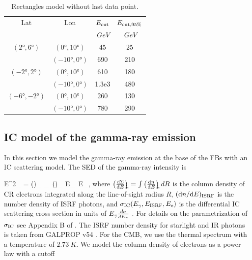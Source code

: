 \begin{table}
  \begin{center}
    \caption{Rectangles model without last data point.}
        \begin{tabular}{|c|c|c|c|} %
     	\hline
		 Lat & Lon  &  $E_{\rm cut}$ &   $E_{\rm cut, 95\%}$  \\ 
		       &        &  {\small $\SI{}{GeV}$ }& {\small  $\SI{}{GeV}$ }\\ 
		\hline
  		$(\ang{2}, \ang{6})$ & $(\ang{0}, \ang{10})$ & 45 &25 \\ 
		& $(\ang{-10}, \ang{0})$ & 690 & 210 \\ 
 		\hline
  		$(\ang{-2}, \ang{2})$ & $(\ang{0}, \ang{10})$  & 610 & 180  \\ 
		& $(\ang{-10}, \ang{0})$    & 1.3e3 & 480\\ 
 		\hline
  		$(\ang{-6}, \ang{-2})$ & $(\ang{0}, \ang{10})$ & 260 & 130   \\ 
		& $(\ang{-10}, \ang{0})$  & 780 & 290\\ 
 \hline
    \end{tabular}
  \end{center}
\end{table}


\subsection{IC model of the gamma-ray emission}
\label{sec:IC_model}

In this section we model the gamma-ray emission at the base of the FBs with an IC scattering model.
The SED of the gamma-ray intensity is

\be
E^2_\g {} = 
\int \int \left(\right)_{\!\!\ISRF} \sigma_\IC\ \left(\right)_{\!\!\el} \de E_\ISRF\, \de E_\el,
\ee
where $\left(\frac{\text{d} \Sigma}{\text{d} E}\right)_{\!\!\text{e}} = \int \left(\frac{\text{d} n}{\text{d} E}\right)_{\!\!\text{e}} dR$ is the column density 
of CR electrons integrated along the line-of-sight radius $R$,
$(\text{d} n/ \text{d} E)_{\text{ISRF}}$ is the number density of ISRF photons,
and $\sigma_{\text{IC}}(E_\gamma, E_{\text{ISRF}}, E_{\text{e}})$
is the differential IC scattering cross section in units of $E_\gamma\frac{d\sigma}{d E_\gamma}$ \citep{1970RvMP...42..237B}.
For details on the parametrization of $\sigma_{\text{IC}}$ see Appendix B of \cite{2014ApJ...793...64A}.
The ISRF number density for starlight and IR photons is taken from GALPROP v54 \citep{2006ApJ...640L.155M}.
For the CMB, we use the thermal spectrum with a temperature of $\SI{2.73}{K}$.
We model the column density of electrons as a power law with a cutoff

